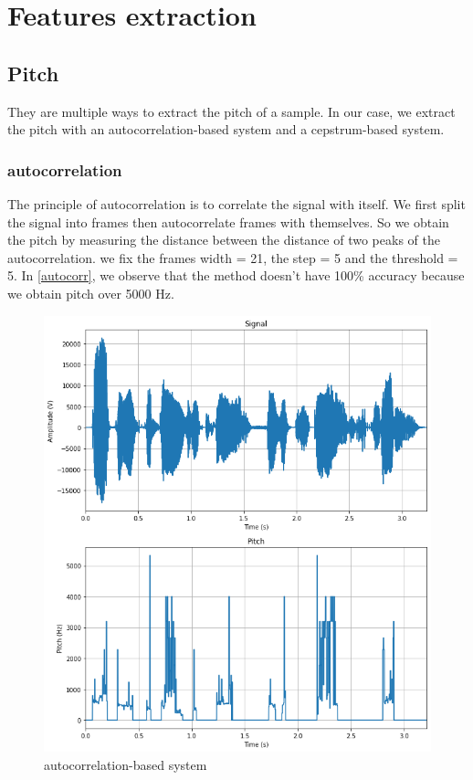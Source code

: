 \documentclass[]{article}
\begin{document}
\section{Features extraction}
\subsection{Pitch}
They are multiple ways to extract the pitch of a sample. In our case, we extract the pitch with an autocorrelation-based
system and a cepstrum-based system.

\subsubsection{autocorrelation}
The principle of autocorrelation is to correlate the signal with itself. We first split the signal into frames then autocorrelate
frames with themselves.
So we obtain the pitch by measuring the distance between the distance of two peaks of the autocorrelation. 
we fix the frames width = 21, the step = 5 and the threshold = 5. 
In \autoref{autocorr}, we observe that the method doesn't have 100\% accuracy because we obtain pitch over 5000 Hz.

\begin{figure}[h]
    \centering
    \includegraphics[scale=0.5]{images/autocorr_pitch.png}
    \caption{\label{autocorr}autocorrelation-based system}
\end{figure}
\end{document}
